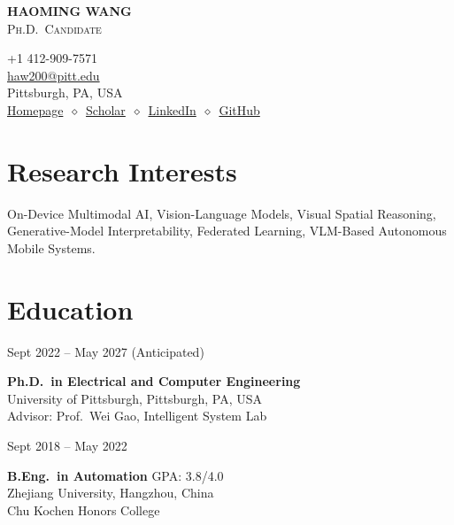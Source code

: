 \documentclass[11pt, letterpaper]{article}
\newenvironment{datedentry}[1]{%
  \par\noindent
  \begin{minipage}[t]{2.8cm}\raggedright\small #1\end{minipage}%
  \hspace{0.3cm}%
  \begin{minipage}[t]{\dimexpr\linewidth-3.1cm\relax}\raggedright
}{\end{minipage}\par\medskip}
\begin{document}
\noindent
\begin{minipage}[t]{0.58\linewidth}
  \vspace{0pt}
  {\fontsize{24pt}{26pt}\selectfont \textbf{HAOMING WANG}}\\[2pt]
  {\scshape\normalsize Ph.D.\ Candidate}
\end{minipage}%
\begin{minipage}[t]{0.42\linewidth}
  \vspace{0pt}
  \raggedleft\small
  +1 412-909-7571 \\
  \href{mailto:haw200@pitt.edu}{haw200@pitt.edu} \\
  Pittsburgh, PA, USA \\[2pt]
  \href{https://haomingwang645.github.io/}{Homepage}\ $\diamond$\ \href{https://scholar.google.com.hk/citations?user=bf6LCjUAAAAJ}{Scholar}\ $\diamond$\ \href{https://www.linkedin.com/in/haoming-wang-40a6a7239/}{LinkedIn}\ $\diamond$\ \href{https://github.com/HaomingWang645}{GitHub}
\end{minipage}

\section{Research Interests}
On-Device Multimodal AI, Vision-Language Models, Visual Spatial Reasoning, Generative-Model Interpretability, Federated Learning, VLM-Based Autonomous Mobile Systems.

\section{Education}

\begin{datedentry}{Sept 2022 -- May 2027 (Anticipated)}
\textbf{Ph.D.\ in Electrical and Computer Engineering}\\
University of Pittsburgh, Pittsburgh, PA, USA\\
Advisor: Prof.\ Wei Gao, Intelligent System Lab
\end{datedentry}

\begin{datedentry}{Sept 2018 -- May 2022}
\textbf{B.Eng.\ in Automation} \hfill GPA: 3.8/4.0\\
Zhejiang University, Hangzhou, China\\
Chu Kochen Honors College
\end{datedentry}

\end{document}
